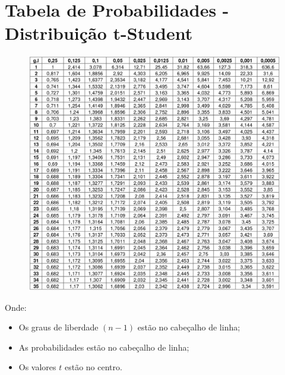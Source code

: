 \chapter{Tabela de Probabilidades - Distribuição t-Student}

\begin{figure}[h]
	\center
	\label{fig:tab-prob-t-student}
	\includegraphics[scale=1.85]{apendices/prob-t-studend.png}
\end{figure}

Onde:
\begin{itemize}
	\item Os graus de liberdade \((n-1)\) estão no cabeçalho de linha;
	\item As probabilidades estão no cabeçalho de linha;	
	\item Os valores \(t\) estão no centro. 
\end{itemize}